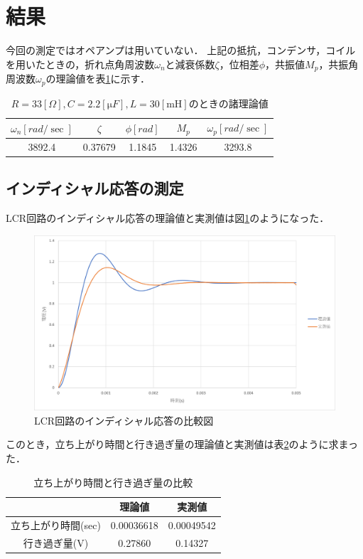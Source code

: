 \documentclass{jlreq}
\numberwithin{equation}{section}
\begin{document}
\section{結果}
今回の測定ではオペアンプは用いていない．
上記の抵抗，コンデンサ，コイルを用いたときの，折れ点角周波数$\omega_n$と減衰係数$\zeta$，位相差$\phi$，共振値$M_p$，共振角周波数$\omega_p$の理論値を表\ref{tab:each_theo}に示す．
\begin{table}[H]
  \centering
  \caption{$R=33[\si{\Omega}], C=2.2[\si{\micro F}], L=30[\si{\milli\henry}]$のときの諸理論値}
  \begin{tabular}{|c|c|c|c|c|}
    \hline
    $\omega_n[\si{rad\per\sec}]$ & $\zeta$ & $\phi[\si{rad}]$ & $M_p$  & $\omega_p[\si{rad\per\sec}]$ \\
    \hline
    3892.4                       & 0.37679 & 1.1845           & 1.4326 & 3293.8                       \\
    \hline
  \end{tabular}
  \label{tab:each_theo}
\end{table}

\subsection{インディシャル応答の測定}
LCR回路のインディシャル応答の理論値と実測値は図\ref{fig:lcr_indicial_without_opamp}のようになった．
\begin{figure}[H]
  \centering
  \includegraphics[width=\textwidth]{assets/lcr_indicial_without_opamp.png}
  \caption{LCR回路のインディシャル応答の比較図}
  \label{fig:lcr_indicial_without_opamp}
\end{figure}

このとき，立ち上がり時間と行き過ぎ量の理論値と実測値は表\ref{tab:rise_time_and_over_excessive_amount}のように求まった．
\begin{table}[H]
  \centering
  \caption{立ち上がり時間と行き過ぎ量の比較}
  \begin{tabular}{|c|c|c|}
    \hline
    ~                   & 理論値     & 実測値     \\
    \hline
    立ち上がり時間(sec) & 0.00036618 & 0.00049542 \\
    \hline
    行き過ぎ量(V)       & 0.27860    & 0.14327    \\
    \hline
  \end{tabular}
  \label{tab:rise_time_and_over_excessive_amount}
\end{table}
\end{document}
